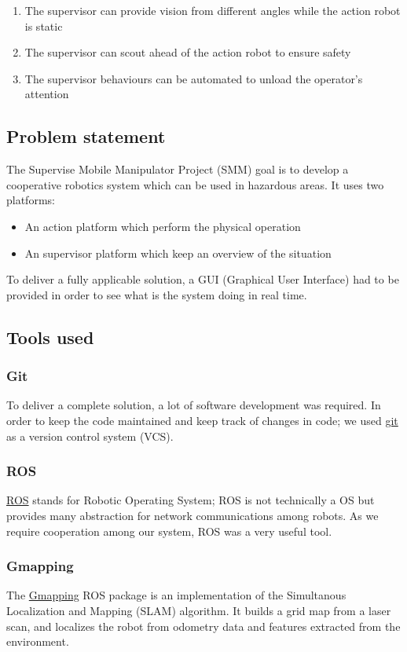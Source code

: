 \documentclass[11pt,a4paper]{article}
\begin{document}
\begin{enumerate}
\item The supervisor can provide vision from different angles while the action robot is static
\item The supervisor can scout ahead of the action robot to ensure safety
\item The supervisor behaviours can be automated to unload the operator's attention
\end{enumerate}


\subsection{Problem statement}
The Supervise Mobile Manipulator Project (SMM) goal is to develop a cooperative robotics
system which can be used in hazardous areas. It uses two platforms: 

\begin{itemize}
\item An action platform which perform the physical operation
\item An supervisor platform which keep an overview of the situation
\end{itemize}

To deliver a fully applicable solution, a GUI (Graphical User Interface) had to be provided in
order to see what is the system doing in real time.


\subsection{Tools used}
\subsubsection{Git}
To deliver a complete solution, a lot of software development was required. In order to keep
the code maintained and keep track of changes in code; we used \href{https://git-scm.com/}{git} as a version control system
 (VCS).

\subsubsection{ROS}
\href{http://www.ros.org}{ROS} stands for Robotic Operating System; ROS is not technically a OS but provides many abstraction for network communications among robots. As we require cooperation among our 
system, ROS was a very useful tool.

\subsubsection{Gmapping}
The \href{http://wiki.ros.org/gmapping}{Gmapping} ROS package is an implementation of the Simultanous Localization and Mapping (SLAM) algorithm. It builds a grid map from a laser scan, and localizes the robot from odometry data and features extracted from the environment.
\end{document}
